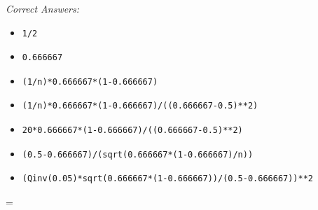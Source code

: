 \documentclass[10pt,dvips]{amsart}
\begin{document}
\par{\small{\it Correct Answers:}
\vspace{-\parskip}\begin{itemize}
\item\begin{verbatim}1/2\end{verbatim}
\item\begin{verbatim}0.666667\end{verbatim}
\item\begin{verbatim}(1/n)*0.666667*(1-0.666667)\end{verbatim}
\item\begin{verbatim}(1/n)*0.666667*(1-0.666667)/((0.666667-0.5)**2)\end{verbatim}
\item\begin{verbatim}20*0.666667*(1-0.666667)/((0.666667-0.5)**2)\end{verbatim}
\item\begin{verbatim}(0.5-0.666667)/(sqrt(0.666667*(1-0.666667)/n))\end{verbatim}
\item\begin{verbatim}(Qinv(0.05)*sqrt(0.666667*(1-0.666667))/(0.5-0.666667))**2\end{verbatim}
\end{itemize}}\par



\columnwidth=\linewidth


% 
% 
\vfill
\end{document}
